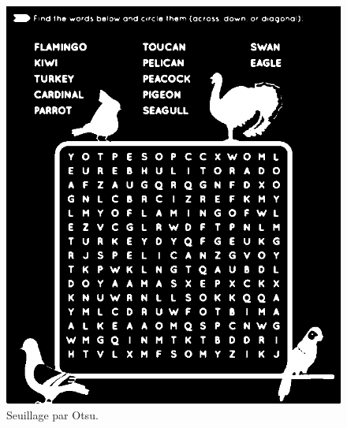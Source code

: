 \documentclass{article}
\begin{document}
\begin{itemize}
\begin{figure}[H]
        \includegraphics[width=\linewidth]{ressources/3level_3_image_2_03_otsu_threshold.png}
        \caption{}
      \endminipage
      \caption{Seuillage par Otsu.}
    \end{figure}


\end{itemize}
\end{document}
